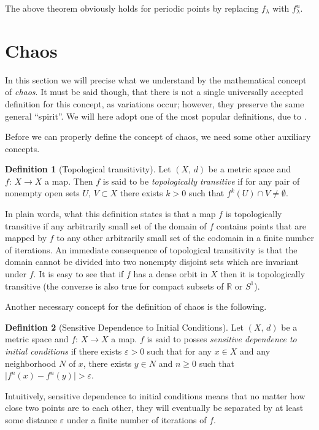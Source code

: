 \documentclass[10pt,twoside,titlepage]{book}
\numberwithin{equation}{chapter}
\numberwithin{figure}{chapter}
\numberwithin{table}{chapter}
\theoremstyle{plain}%
\theoremstyle{definition}
\newtheorem{defn}{Definition}[chapter]
\theoremstyle{remark}
\begin{document}
The above theorem obviously holds for periodic points by replacing $f_{\lambda}$ with $f^n_{\lambda}$.


\section{Chaos}
\label{sec:Chaos}

In this section we will precise what we understand by the mathematical concept of \emph{chaos}. It must be said though, that there is not a single universally accepted definition for this concept, as variations occur; however, they preserve the same general ``spirit''. We will here adopt one of the most popular definitions, due to \cite{DevaneyIntroCDD}.

Before we can properly define the concept of chaos, we need some other auxiliary concepts.

\begin{defn}[Topological transitivity]
	Let $(X,\,d)$ be a metric space and $f:\,X\rightarrow X$ a map. Then $f$ is said to be \emph{topologically transitive} if for any pair of nonempty open sets $U,\,V\subset X$ there exists $k>0$ such that $f^k(U)\cap V\neq \emptyset$.
\end{defn}

In plain words, what this definition states is that a map $f$ is topologically transitive if any arbitrarily small set of the domain of $f$ contains points that are mapped by $f$ to any other arbitrarily small set of the codomain in a finite number of iterations. An immediate consequence of topological transitivity is that the domain cannot be divided into two nonempty disjoint sets which are invariant under $f$. It is easy to see that if $f$ has a dense orbit in $X$ then it is topologically transitive (the converse is also true for compact subsets of $\mathbb{R}$ or $S^1$).

Another necessary concept for the definition of chaos is the following.

\begin{defn}[Sensitive Dependence to Initial Conditions]
	Let $(X,\,d)$ be a metric space and $f:\,X\rightarrow X$ a map. $f$ is said to posses \emph{sensitive dependence to initial conditions} if there exists $\varepsilon >0$ such that for any $x\in X$ and any neighborhood $N$ of $x$, there exists $y\in N$ and $n\geq 0$ such that $\vert f^n(x)-f^n(y)\vert > \varepsilon$.
\end{defn}

Intuitively, sensitive dependence to initial conditions means that no matter how close two points are to each other, they will eventually be separated by at least some distance $\varepsilon$ under a finite number of iterations of $f$.
\end{document}
